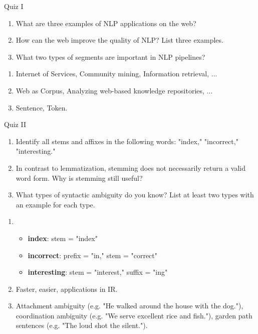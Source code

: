 \documentclass{article}
\author{Leopold Lemmermann}
\begin{document}
\createtitle


\begin{exercise}{Quiz I}
  \begin{enumerate}
    \item What are three examples of NLP applications on the web?
    \item How can the web improve the quality of NLP? List three examples.
    \item What two types of segments are important in NLP pipelines?
  \end{enumerate}

  \begin{solution}
    \begin{enumerate}
      \item Internet of Services, Community mining, Information retrieval, ...
      \item Web as Corpus, Analyzing web-based knowledge repositories, ...
      \item Sentence, Token.
    \end{enumerate}
  \end{solution}
\end{exercise}

\begin{exercise}{Quiz II}
  \begin{enumerate}
    \item Identify all stems and affixes in the following words: "index," "incorrect," "interesting."
    \item In contrast to lemmatization, stemming does not necessarily return a valid word form. Why is stemming still useful?
    \item What types of syntactic ambiguity do you know? List at least two types with an example for each type.
  \end{enumerate}

  \begin{solution}
    \begin{enumerate}
      \item \begin{itemize}
          \item \textbf{index}: stem = "index"
          \item \textbf{incorrect}: prefix = "in," stem = "correct"
          \item \textbf{interesting}: stem = "interest," suffix = "ing"
        \end{itemize}
      \item Faster, easier, applications in IR.
      \item Attachment ambiguity (e.g. "He walked around the house with the dog."), coordination ambiguity (e.g. "We serve excellent rice and fish."), garden path sentences (e.g. "The loud shot the silent.").
    \end{enumerate}
  \end{solution}
\end{exercise}
\end{document}
